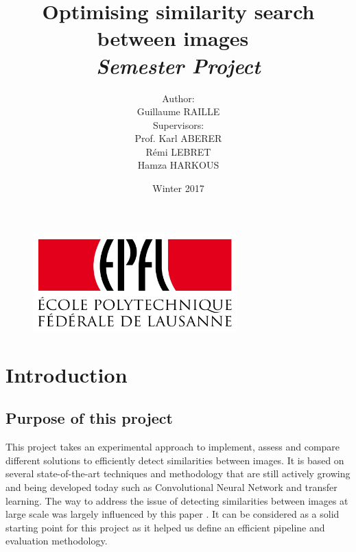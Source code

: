 \documentclass[a4paper]{article}
\begin{document}
\title{\textbf{\huge Optimising similarity search between images}\  \\  \textit{Semester Project}\vspace{3 cm}}

\author{Author:\\ Guillaume RAILLE \vspace{1 cm}\\ Supervisors: \\ Prof. Karl ABERER \\ Rémi LEBRET \\ Hamza HARKOUS  \vspace{3 cm}}



\date{Winter 2017}


\begin{figure}
\centering
\includegraphics[width=0.7\textwidth]{epfl}
\end{figure}
\renewcommand{\headrulewidth}{1pt}

\maketitle
\pagestyle{fancy}

\newpage
\section*{Introduction}
	\subsection*{Purpose of this project}
	This project takes an experimental approach to implement, assess and compare different solutions to efficiently detect similarities between images. It is based on several state-of-the-art techniques and methodology that are still actively growing and being developed today such as Convolutional Neural Network and transfer learning. The way to address the issue of detecting similarities between images at large scale was largely influenced by this paper \cite{large-scale-search}. It can be considered as a solid starting point for this project as it helped us define an efficient pipeline and evaluation methodology.
	
\end{document}
